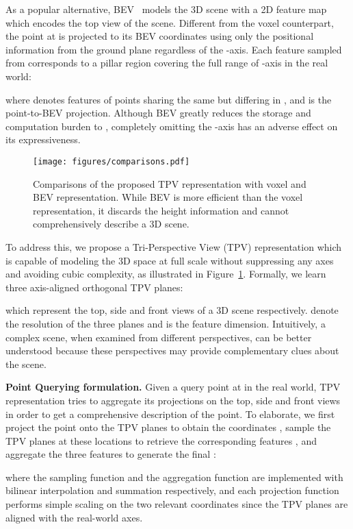 \documentclass[10pt,twocolumn,letterpaper]{article}
\begin{document}
As a popular alternative, BEV~\cite{polarformer,bevformer,bevdepth,bevfusion} models the 3D scene with a 2D feature map  which encodes the top view of the scene.
Different from the voxel counterpart, the point at  is projected to its BEV coordinates  using only the positional information from the ground plane regardless of the -axis.
Each feature  sampled from  corresponds to a pillar region covering the full range of -axis in the real world:

where  denotes features of points sharing the same  but differing in , and  is the point-to-BEV projection.
Although BEV greatly reduces the storage and computation burden to , completely omitting the -axis has an adverse effect on its expressiveness. 

\begin{figure}[t]
\centering
\texttt{[image: figures/comparisons.pdf]}
\vspace{-7mm}
\caption{Comparisons of the proposed TPV representation with voxel and BEV representation.
While BEV is more efficient than the voxel representation, it discards the height information and cannot comprehensively describe a 3D scene.
}
\label{fig:comparisons}
\vspace{-6mm}
\end{figure}

To address this, we propose a Tri-Perspective View (TPV) representation which is capable of modeling the 3D space at full scale without suppressing any axes and avoiding cubic complexity, as illustrated in Figure~\ref{fig:comparisons}.
Formally, we learn three axis-aligned orthogonal TPV planes:

which represent the top, side and front views of a 3D scene respectively.
 denote the resolution of the three planes and  is the feature dimension.
Intuitively, a complex scene, when examined from different perspectives, can be better understood because these perspectives may provide complementary clues about the scene.

\textbf{Point Querying formulation.}
Given a query point at  in the real world, TPV representation tries to aggregate its projections on the top, side and front views in order to get a comprehensive description of the point.
To elaborate, we first project the point onto the TPV planes to obtain the coordinates , sample the TPV planes at these locations to retrieve the corresponding features , and aggregate the three features to generate the final :


where the sampling function  and the aggregation function  are implemented with bilinear interpolation and summation respectively, and each projection function  performs simple scaling on the two relevant coordinates since the TPV planes are aligned with the real-world axes.
\end{document}
